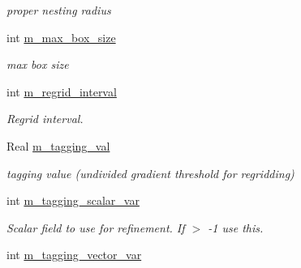 \begin{DoxyCompactItemize}
\begin{DoxyCompactList}\small\item\em proper nesting radius \end{DoxyCompactList}\item 
\hypertarget{classamr_mushy_layer_af41c908443cec4bef1502413e8b18a26}{int \hyperlink{classamr_mushy_layer_af41c908443cec4bef1502413e8b18a26}{m\-\_\-max\-\_\-box\-\_\-size}}\label{classamr_mushy_layer_af41c908443cec4bef1502413e8b18a26}

\begin{DoxyCompactList}\small\item\em max box size \end{DoxyCompactList}\item 
\hypertarget{classamr_mushy_layer_abe028c34b8f5137455d005da47936a59}{int \hyperlink{classamr_mushy_layer_abe028c34b8f5137455d005da47936a59}{m\-\_\-regrid\-\_\-interval}}\label{classamr_mushy_layer_abe028c34b8f5137455d005da47936a59}

\begin{DoxyCompactList}\small\item\em Regrid interval. \end{DoxyCompactList}\item 
\hypertarget{classamr_mushy_layer_a330704138f8cdb8cfce8e01bfe74cb1c}{Real \hyperlink{classamr_mushy_layer_a330704138f8cdb8cfce8e01bfe74cb1c}{m\-\_\-tagging\-\_\-val}}\label{classamr_mushy_layer_a330704138f8cdb8cfce8e01bfe74cb1c}

\begin{DoxyCompactList}\small\item\em tagging value (undivided gradient threshold for regridding) \end{DoxyCompactList}\item 
\hypertarget{classamr_mushy_layer_aaebc6f69efd64b3eac01a2895dff9528}{int \hyperlink{classamr_mushy_layer_aaebc6f69efd64b3eac01a2895dff9528}{m\-\_\-tagging\-\_\-scalar\-\_\-var}}\label{classamr_mushy_layer_aaebc6f69efd64b3eac01a2895dff9528}

\begin{DoxyCompactList}\small\item\em Scalar field to use for refinement. If $>$ -\/1 use this. \end{DoxyCompactList}\item 
\hypertarget{classamr_mushy_layer_a9723904fd2f8564e484e3413275aebbc}{int \hyperlink{classamr_mushy_layer_a9723904fd2f8564e484e3413275aebbc}{m\-\_\-tagging\-\_\-vector\-\_\-var}}\label{classamr_mushy_layer_a9723904fd2f8564e484e3413275aebbc}


\end{DoxyCompactItemize}
